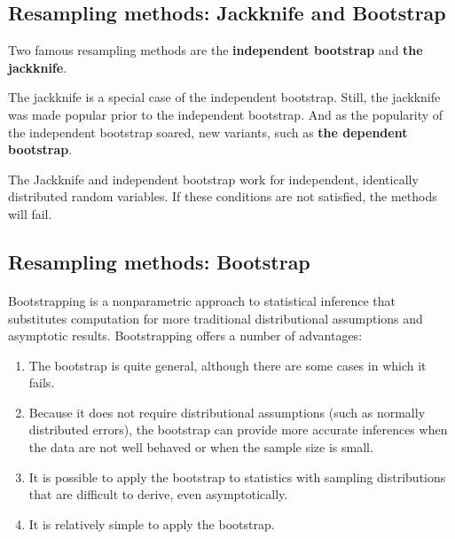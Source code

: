 \documentclass[%
oneside,                 %
final,                   %
10pt]{article}
\begin{document}
\subsection*{Resampling methods: Jackknife and Bootstrap}

Two famous
resampling methods are the \textbf{independent bootstrap} and \textbf{the jackknife}. 

The jackknife is a special case of the independent bootstrap. Still, the jackknife was made
popular prior to the independent bootstrap. And as the popularity of
the independent bootstrap soared, new variants, such as \textbf{the dependent bootstrap}.

The Jackknife and independent bootstrap work for
independent, identically distributed random variables.
If these conditions are not
satisfied, the methods will fail.


\subsection*{Resampling methods: Bootstrap}

\paragraph{}
Bootstrapping is a nonparametric approach to statistical inference
that substitutes computation for more traditional distributional
assumptions and asymptotic results. Bootstrapping offers a number of
advantages: 
\begin{enumerate}
\item The bootstrap is quite general, although there are some cases in which it fails.  

\item Because it does not require distributional assumptions (such as normally distributed errors), the bootstrap can provide more accurate inferences when the data are not well behaved or when the sample size is small.  

\item It is possible to apply the bootstrap to statistics with sampling distributions that are difficult to derive, even asymptotically. 

\item It is relatively simple to apply the bootstrap.
\end{enumerate}

\noindent
\end{document}
